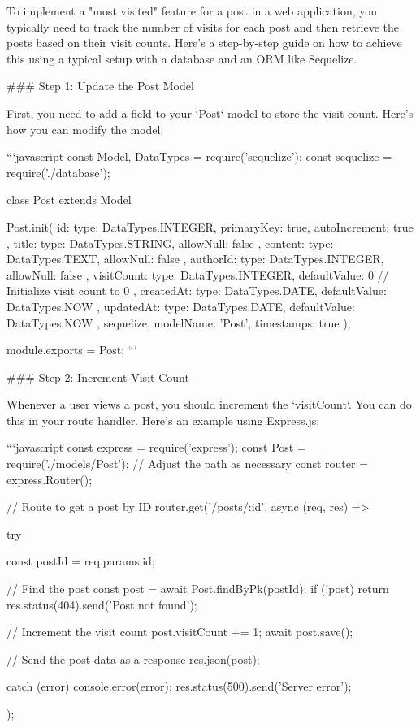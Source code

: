 To implement a "most visited" feature for a post in a web application, you typically need to track the number of visits for each post and then retrieve the posts based on their visit counts. Here’s a step-by-step guide on how to achieve this using a typical setup with a database and an ORM like Sequelize.

### Step 1: Update the Post Model

First, you need to add a field to your `Post` model to store the visit count. Here’s how you can modify the model:

```javascript
const { Model, DataTypes } = require('sequelize');
const sequelize = require('./database');

class Post extends Model {}

Post.init({
  id: {
    type: DataTypes.INTEGER,
    primaryKey: true,
    autoIncrement: true
  },
  title: {
    type: DataTypes.STRING,
    allowNull: false
  },
  content: {
    type: DataTypes.TEXT,
    allowNull: false
  },
  authorId: {
    type: DataTypes.INTEGER,
    allowNull: false
  },
  visitCount: {
    type: DataTypes.INTEGER,
    defaultValue: 0 // Initialize visit count to 0
  },
  createdAt: {
    type: DataTypes.DATE,
    defaultValue: DataTypes.NOW
  },
  updatedAt: {
    type: DataTypes.DATE,
    defaultValue: DataTypes.NOW
  }
}, {
  sequelize,
  modelName: 'Post',
  timestamps: true
});

module.exports = Post;
```

### Step 2: Increment Visit Count

Whenever a user views a post, you should increment the `visitCount`. You can do this in your route handler. Here’s an example using Express.js:

```javascript
const express = require('express');
const Post = require('./models/Post'); // Adjust the path as necessary
const router = express.Router();

// Route to get a post by ID
router.get('/posts/:id', async (req, res) => {
  try {
    const postId = req.params.id;

    // Find the post
    const post = await Post.findByPk(postId);
    if (!post) {
      return res.status(404).send('Post not found');
    }

    // Increment the visit count
    post.visitCount += 1;
    await post.save();

    // Send the post data as a response
    res.json(post);
  } catch (error) {
    console.error(error);
    res.status(500).send('Server error');
  }
});

